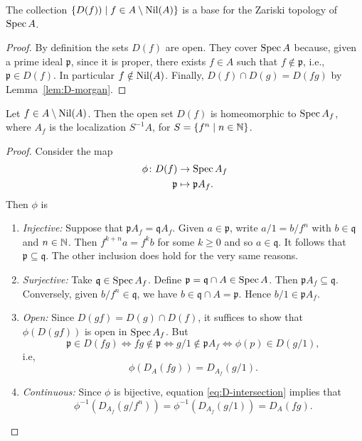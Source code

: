\begin{thm}
    The collection\/ $\{D(f))\mid f\in A\setminus\operatorname{Nil}(A)\}$ is a base for the Zariski topology of\/ $\operatorname{Spec} A$.
\end{thm}

\begin{proof}
    By definition the sets $D(f)$ are open. They cover $\operatorname{Spec} A$ because, given a prime ideal $\mathfrak p$, since it is proper, there exists $f\in A$ such that $f\notin\mathfrak p$, i.e., $\mathfrak p\in D(f)$. In particular $f\notin\operatorname{Nil}(A)$. Finally, $D(f)\cap D(g)=D(fg)$ by Lemma~\ref{lem:D-morgan}.
\end{proof}

\begin{thm}\label{thm:Spec(Af)-is-D(f)}
    Let $f\in A\setminus\operatorname{Nil}(A)$. Then the open set\/ $D(f)$ is homeomorphic to\/ $\operatorname{Spec} A_f$, where\/ $A_f$ is the localization\/ $S^{-1}A$, for\/ $S=\{f^n\mid n\in\mathbb{N}\}$.
\end{thm}

\begin{proof}
    Consider the map
    \begin{align*}
        \phi\colon D(f)&\to\operatorname{Spec} A_f\\
            \mathfrak p&\mapsto \mathfrak pA_f.
    \end{align*}
    Then $\phi$ is
    \begin{enumerate}[-]
        \item \textit{Injective:} Suppose that $\mathfrak pA_f=\mathfrak qA_f$. Given $a\in\mathfrak p$, write $a/1=b/f^n$ with $b\in\mathfrak q$ and $n\in\mathbb{N}$. Then $f^{k+n}a=f^kb$ for some $k\ge0$ and so $a\in\mathfrak q$. It follows that $\mathfrak p\subseteq\mathfrak q$. The other inclusion does hold for the very same reasons.

        \item \textit{Surjective:} Take $\mathfrak q\in\operatorname{Spec} A_f$. Define $\mathfrak p=\mathfrak q\cap A\in\operatorname{Spec} A$. Then $\mathfrak pA_f\subseteq\mathfrak q$. Conversely, given $b/f^n\in\mathfrak q$, we have $b\in\mathfrak q\cap A=\mathfrak p$. Hence $b/1\in\mathfrak pA_f$.

        \item \textit{Open:} Since $D(gf)=D(g)\cap D(f)$, it suffices to show that $\phi(D(gf))$ is open in $\operatorname{Spec} A_f$. But
        $$
            \mathfrak p\in D(fg)
                \iff fg\notin\mathfrak p
                \iff g/1\notin\mathfrak pA_f
                \iff \phi(p)\in D(g/1),
        $$
        i.e,
        \begin{equation}\label{eq:D-intersection}
            \phi(D_A(fg))=D_{A_f}(g/1).
        \end{equation}

        \item \textit{Continuous:} Since $\phi$ is bijective, equation \eqref{eq:D-intersection} implies that
        $$
            \phi^{-1}(D_{A_f}(g/f^n))=\phi^{-1}(D_{A_f}(g/1))=D_A(fg).
        $$
    \end{enumerate}
\end{proof}

